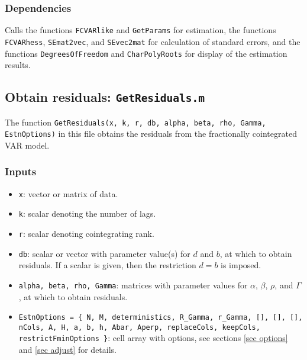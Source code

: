 \documentclass[12pt]{article}
\begin{document}
\subsubsection*{Dependencies} 

Calls the functions \texttt{FCVARlike} and \texttt{GetParams} for estimation, the functions \texttt{FCVARhess}, \texttt{SEmat2vec}, and \texttt{SEvec2mat} for calculation of standard errors, and the functions \texttt{DegreesOfFreedom} and \texttt{CharPolyRoots} for display of the estimation results.



\newpage 

\subsection{Obtain residuals: \texttt{GetResiduals.m}\label{sec resid}}

The function \texttt{GetResiduals(x, k, r, db, alpha, beta, rho, Gamma, EstnOptions)} in this file obtains the residuals from the fractionally cointegrated VAR model. 


\subsubsection*{Inputs}

\begin{itemize}

\item \texttt{x}: vector or matrix of data.

\item \texttt{k}: scalar denoting the number of lags.

\item \texttt{r}: scalar denoting cointegrating rank.

\item \texttt{db}: scalar or vector with parameter value(s) for $d$ and $b$, at which to obtain residuals. If a scalar is given, then the restriction $d=b$ is imposed.

\item \texttt{alpha, beta, rho, Gamma}: matrices with parameter values for $\alpha$, $\beta$, $\rho$, and $\Gamma$, at which to obtain residuals.

\item \texttt{EstnOptions = \{ N, M, deterministics, R\_Gamma, r\_Gamma, [], [], [], nCols, A, H, a, b, h, Abar, Aperp, replaceCols, keepCols, restrictFminOptions \}}:  cell array with options, see sections \ref{sec options} and \ref{sec adjust} for details.

\end{itemize}
\end{document}
